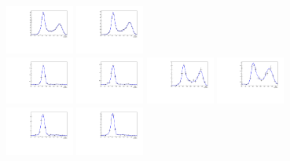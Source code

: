 \begin{figure}[htbp]
  \includegraphics[width=0.2\textwidth]{fig/2Dfit/LNuJJ_res_MJJ_mu_LP_nobb_LDy.pdf}
  \includegraphics[width=0.2\textwidth]{fig/2Dfit/LNuJJ_res_MJJ_e_LP_nobb_LDy.pdf}\\
  \includegraphics[width=0.2\textwidth]{fig/2Dfit/LNuJJ_res_MJJ_mu_HP_vbf_LDy.pdf}
  \includegraphics[width=0.2\textwidth]{fig/2Dfit/LNuJJ_res_MJJ_e_HP_vbf_LDy.pdf}
  \includegraphics[width=0.2\textwidth]{fig/2Dfit/LNuJJ_res_MJJ_mu_LP_vbf_LDy.pdf}
  \includegraphics[width=0.2\textwidth]{fig/2Dfit/LNuJJ_res_MJJ_e_LP_vbf_LDy.pdf}\\
  \includegraphics[width=0.2\textwidth]{fig/2Dfit/LNuJJ_res_MJJ_mu_HP_bb_HDy.pdf}
  \includegraphics[width=0.2\textwidth]{fig/2Dfit/LNuJJ_res_MJJ_e_HP_bb_HDy.pdf}

\end{figure}
